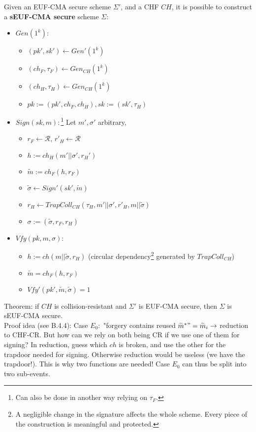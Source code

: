 \documentclass[oneside]{book}
\begin{document}
Given an EUF-CMA secure scheme $\Sigma'$, and a CHF $CH$, it is possible to construct a \textbf{sEUF-CMA secure} scheme $\Sigma$:
\begin{itemize}
    \item $Gen(1^k): $
    \begin{itemize}
        \item $(pk', sk') \leftarrow Gen'(1^k)$
        \item $(ch_F, \tau_F) \leftarrow Gen_{CH}(1^k)$
        \item $(ch_H, \tau_H) \leftarrow Gen_{CH}(1^k)$
        \item $pk := (pk', ch_F, ch_H), sk := (sk', \tau_H)$
    \end{itemize}
    \item $Sign(sk, m):$\footnote{Can also be done in another way relying on $\tau_F$.} Let $m', \sigma'$ arbitrary,
    \begin{itemize}
        \item $r_F \leftarrow \mathcal{R}$, $r'_H \leftarrow \mathcal{R}$
        \item $h := ch_H(m'||\sigma', r_H')$
        \item $\widetilde{m} := ch_F(h, r_F)$
        \item $\widetilde{\sigma} \leftarrow Sign'(sk', \widetilde{m})$
        \item $r_H \leftarrow TrapColl_{CH}(\tau_H, m'||\sigma', r'_H, m||\widetilde{\sigma})$
        \item $\sigma := (\widetilde{\sigma}, r_F, r_H)$
    \end{itemize}
    \item $Vfy(pk, m, \sigma): $
    \begin{itemize}
        \item $h := ch(m||\widetilde{\sigma}, r_H)$ (circular dependency\footnote{A negligible change in the signature affects the whole scheme. Every piece of the construction is meaningful and protected.} generated by $TrapColl_{CH}$)
        \item $\widetilde{m} = ch_F(h, r_F)$
        \item $Vfy'(pk', \widetilde{m}, \widetilde{\sigma}) = 1$
    \end{itemize}
\end{itemize}

Theorem: if $CH$ is collision-resistant and $\Sigma'$ is EUF-CMA secure, then $\Sigma$ is sEUF-CMA secure.\\

Proof idea (see B.4.4): Case $E_0:$ "forgery contains reused $\widetilde{m}^* " = \widetilde{m}_i \rightarrow$ reduction to CHF-CR. But how can we rely on both being CR if we use one of them for signing? In reduction, guess which $ch$ is broken, and use the other for the trapdoor needed for signing. Otherwise reduction would be useless (we have the trapdoor!). This is why two functions are needed! Case $E_0$ can thus be split into two sub-events.\\
\end{document}
